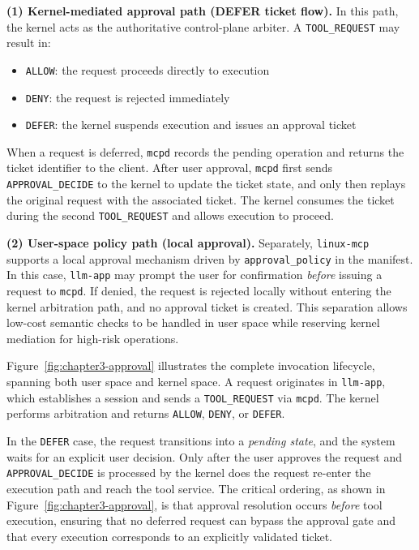 \textbf{(1) Kernel-mediated approval path (DEFER ticket flow).}
In this path, the kernel acts as the authoritative control-plane arbiter.
A \texttt{TOOL\_REQUEST} may result in:
\begin{itemize}
    \item \texttt{ALLOW}: the request proceeds directly to execution
    \item \texttt{DENY}: the request is rejected immediately
    \item \texttt{DEFER}: the kernel suspends execution and issues an approval ticket
\end{itemize}
When a request is deferred, \texttt{mcpd} records the pending operation and returns the ticket identifier to the client.
After user approval, \texttt{mcpd} first sends \texttt{APPROVAL\_DECIDE} to the kernel to update the ticket state, and only then replays the original request with the associated ticket.
The kernel consumes the ticket during the second \texttt{TOOL\_REQUEST} and allows execution to proceed.

\textbf{(2) User-space policy path (local approval).}
Separately, \texttt{linux-mcp} supports a local approval mechanism driven by \texttt{approval\_policy} in the manifest.
In this case, \texttt{llm-app} may prompt the user for confirmation \emph{before} issuing a request to \texttt{mcpd}.
If denied, the request is rejected locally without entering the kernel arbitration path, and no approval ticket is created.
This separation allows low-cost semantic checks to be handled in user space while reserving kernel mediation for high-risk operations.

Figure~\ref{fig:chapter3-approval} illustrates the complete invocation lifecycle, spanning both user space and kernel space.
A request originates in \texttt{llm-app}, which establishes a session and sends a \texttt{TOOL\_REQUEST} via \texttt{mcpd}.
The kernel performs arbitration and returns \texttt{ALLOW}, \texttt{DENY}, or \texttt{DEFER}.

In the \texttt{DEFER} case, the request transitions into a \emph{pending state}, and the system waits for an explicit user decision.
Only after the user approves the request and \texttt{APPROVAL\_DECIDE} is processed by the kernel does the request re-enter the execution path and reach the tool service.
The critical ordering, as shown in Figure~\ref{fig:chapter3-approval}, is that approval resolution occurs \emph{before} tool execution, ensuring that no deferred request can bypass the approval gate and that every execution corresponds to an explicitly validated ticket.

